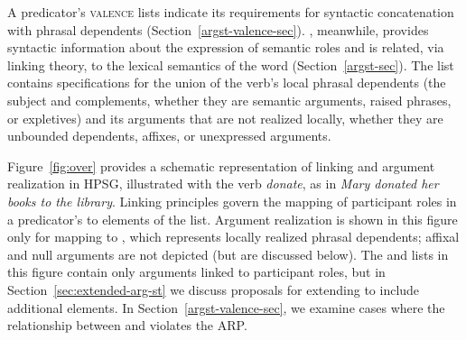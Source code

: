\documentclass[output=paper
 	        ,biblatex
                ,babelshorthands
                ,newtxmath
                ,draftmode
                ,colorlinks, citecolor=brown
]{langscibook}
\begin{document}
A predicator's \textsc{valence} lists indicate its requirements for syntactic concatenation with
phrasal dependents (Section~\ref{argst-valence-sec}).  \argst, meanwhile, provides syntactic
information about the expression of semantic roles and is related, via linking theory, to the
lexical semantics of the word (Section~\ref{argst-sec}).  The \argst list contains specifications
for the union of the verb's local phrasal dependents (the subject and complements, whether they are
semantic arguments, raised phrases, or expletives) and its arguments that are not realized locally,
whether they are unbounded dependents, affixes, or unexpressed
arguments.

Figure~\ref{fig:over} provides a schematic representation of %
linking and argument realization in HPSG,  illustrated with the verb \textit{donate}, as in
\textit{Mary donated her books to the library}.   Linking principles govern the mapping of
participant roles in a predicator's \content to %
 elements of the \argst list.   Argument realization
is shown in this figure only for mapping to , which represents locally realized phrasal
dependents; affixal and null arguments are not depicted (but are discussed below). 
The \argst and  lists in this figure contain only arguments linked to participant
roles,  but in
Section~\ref{sec:extended-arg-st} we discuss proposals for extending \argst to include additional
elements. In Section~\ref{argst-valence-sec}, we examine cases where the relationship between \argst
and  violates the ARP.
\end{document}
